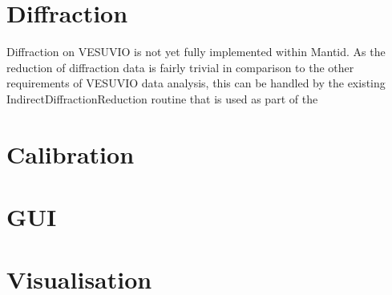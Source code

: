 \documentclass[paper=a4, fontsize=11pt]{scrartcl}	%
\numberwithin{equation}{section}															%
\numberwithin{figure}{section}																%
\numberwithin{table}{section}
\begin{document}
\section{Diffraction}
\label{sec:diffraction}
Diffraction on VESUVIO is not yet fully implemented within Mantid. As the reduction of diffraction data is fairly trivial in comparison to the other requirements of VESUVIO data analysis, this can be handled by the existing IndirectDiffractionReduction routine that is used as part of the 

\section{Calibration}
\label{sec:calibration}

\section{GUI}
\label{sec:GUI}

\section{Visualisation}
\label{sec:visualisation}




\end{document}
